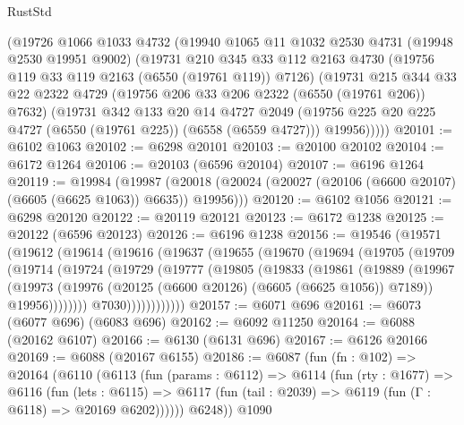 \begin{lexlean}{RustStd}
\begin{coremodule}
    (@19726
      @1066
      @1033
      @4732
      (@19940
        @1065
        @11
        @1032
        @2530
        @4731
        (@19948 @2530 @19951 @9002)
        (@19731
          @210
          @345
          @33
          @112
          @2163
          @4730
          (@19756 @119 @33 @119 @2163 (@6550 (@19761 @119)) @7126)
          (@19731
            @215
            @344
            @33
            @22
            @2322
            @4729
            (@19756 @206 @33 @206 @2322 (@6550 (@19761 @206)) @7632)
            (@19731
              @342
              @133
              @20
              @14
              @4727
              @2049
              (@19756 @225 @20 @225 @4727 (@6550 (@19761 @225)) (@6558 (@6559 @4727)))
              @19956)))))
@20101 := @6102 @1063
@20102 := @6298 @20101
@20103 := @20100 @20102
@20104 := @6172 @1264
@20106 := @20103 (@6596 @20104)
@20107 := @6196 @1264
@20119 := @19984
    (@19987 (@20018 (@20024 (@20027 (@20106 (@6600 @20107) (@6605 (@6625 @1063)) @6635)) @19956)))
@20120 := @6102 @1056
@20121 := @6298 @20120
@20122 := @20119 @20121
@20123 := @6172 @1238
@20125 := @20122 (@6596 @20123)
@20126 := @6196 @1238
@20156 := @19546
    (@19571
      (@19612
        (@19614
          (@19616
            (@19637
              (@19655
                (@19670
                  (@19694
                    (@19705
                      (@19709
                        (@19714
                          (@19724
                            (@19729
                              (@19777
                                (@19805
                                  (@19833
                                    (@19861
                                      (@19889
                                        (@19967
                                          (@19973
                                            (@19976
                                              (@20125 (@6600 @20126) (@6605 (@6625 @1056)) @7189))
                                            @19956))))))))
                            @7030))))))))))))
@20157 := @6071 @696
@20161 := @6073 (@6077 @696) (@6083 @696)
@20162 := @6092 @11250
@20164 := @6088 (@20162 @6107)
@20166 := @6130 (@6131 @696)
@20167 := @6126 @20166
@20169 := @6088 (@20167 @6155)
@20186 := @6087
    (fun (fn : @102) =>
    @20164
      (@6110
        (@6113
          (fun (params : @6112) =>
          @6114
            (fun (rty : @1677) =>
            @6116
              (fun (lets : @6115) =>
              @6117 (fun (tail : @2039) => @6119 (fun (Γ : @6118) => @20169 @6202))))))
        @6248))
    @1090

\end{coremodule}
\end{lexlean}
